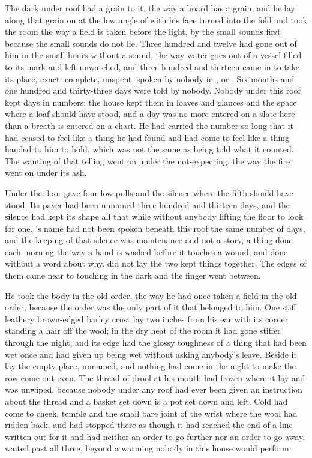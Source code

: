 
The dark under  roof had a grain to it, the way a board has a grain, and he lay along that grain on  at the low angle of  with his face turned into the fold and took the room the way a field is taken before the light, by the small sounds first because the small sounds do not lie. Three hundred and twelve had gone out of him in the small hours without a sound, the way water goes out of a vessel filled to its mark and left unwatched, and three hundred and thirteen came in to take its place, exact, complete, unspent, spoken by nobody in ,  or . Six months and one hundred and thirty-three days were told by nobody. Nobody under this roof kept days in numbers; the house kept them in loaves and glances and the space where a loaf should have stood, and a day was no more entered on a slate here than a breath is entered on a chart. He had carried the number so long that it had ceased to feel like a thing he had found and had come to feel like a thing handed to him to hold, which was not the same as being told what it counted. The wanting of that telling went on under the not-expecting, the way the fire went on under its ash.

Under the floor  gave four low pulls and the silence where the fifth should have stood. Its payer had been unnamed three hundred and thirteen days, and the silence had kept its shape all that while without anybody lifting the floor to look for one. 's name had not been spoken beneath this roof the same number of days, and the keeping of that silence was maintenance and not a story, a thing done each morning the way a hand is washed before it touches a wound, and done without a word about why.  did not lay the two kept things together. The edges of them came near to touching in the dark and the finger went between.

He took the body in the old order, the way he had once taken a field in the old order, because the order was the only part of it that belonged to him. One stiff leathery brown-edged barley crust lay two inches from his ear with its corner standing a hair off the wool; in the dry heat of the room it had gone stiffer through the night, and its edge had the glossy toughness of a thing that had been wet once and had given up being wet without asking anybody's leave. Beside it lay the empty place, unnamed, and nothing had come in the night to make the row come out even. The thread of drool at his mouth had frozen where it lay and was unwiped, because nobody under any roof had ever been given an instruction about the thread and a basket set down is a pot set down and left. Cold had come to cheek, temple and the small bare joint of the wrist where the wool had ridden back, and had stopped there as though it had reached the end of a line written out for it and had neither an order to go further nor an order to go away.  waited past all three, beyond a warming nobody in this house would perform.

